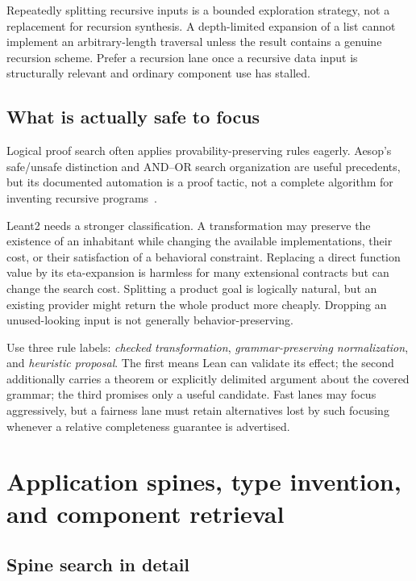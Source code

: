 Repeatedly splitting recursive inputs is a bounded exploration strategy, not a replacement for recursion synthesis. A depth-limited expansion of a list cannot implement an arbitrary-length traversal unless the result contains a genuine recursion scheme. Prefer a recursion lane once a recursive data input is structurally relevant and ordinary component use has stalled.

\subsection{What is actually safe to focus}

Logical proof search often applies provability-preserving rules eagerly. Aesop's safe/unsafe distinction and AND--OR search organization are useful precedents, but its documented automation is a proof tactic, not a complete algorithm for inventing recursive programs~\cite{aesop,aesop-paper}.

Leant2 needs a stronger classification. A transformation may preserve the existence of an inhabitant while changing the available implementations, their cost, or their satisfaction of a behavioral constraint. Replacing a direct function value by its eta-expansion is harmless for many extensional contracts but can change the search cost. Splitting a product goal is logically natural, but an existing provider might return the whole product more cheaply. Dropping an unused-looking input is not generally behavior-preserving.

Use three rule labels: \emph{checked transformation}, \emph{grammar-preserving normalization}, and \emph{heuristic proposal}. The first means Lean can validate its effect; the second additionally carries a theorem or explicitly delimited argument about the covered grammar; the third promises only a useful candidate. Fast lanes may focus aggressively, but a fairness lane must retain alternatives lost by such focusing whenever a relative completeness guarantee is advertised.

\section{Application spines, type invention, and component retrieval}
\label{sec:spines}

\subsection{Spine search in detail}

